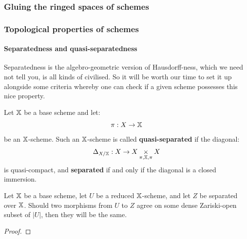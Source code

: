             \subsubsection{Gluing the ringed spaces of schemes}
            
            \subsubsection{Topological properties of schemes}
                \paragraph{Separatedness and quasi-separatedness}
                    Separatedness is the algebro-geometric version of Hausdorff-ness, which we need not tell you, is all kinds of civilised. So it will be worth our time to set it up alongside some criteria whereby one can check if a given scheme possesses this nice property. 
                    
                    \begin{definition} \label{def: separatedness}
                        Let $\mathbb{X}$ be a base scheme and let:
                            $$\pi: X \to \mathbb{X}$$
                        be an $\mathbb{X}$-scheme. Such an $\mathbb{X}$-scheme is called \textbf{quasi-separated} if the diagonal:
                            $$\Delta_{X/\bbX}: X \to X \x_{\pi, \bbX, \pi} X$$
                        is quasi-compact, and \textbf{separated} if and only if the diagonal is a closed immersion. 
                    \end{definition}
                    
                    \begin{lemma} \label{lemma: reduced_to_separated}
                        Let $\mathbb{X}$ be a base scheme, let $U$ be a reduced $\mathbb{X}$-scheme, and let $Z$ be separated over $\mathbb{X}$. Should two morphisms from $U$ to $Z$ agree on some dense Zariski-open subset of $|U|$, then they will be the same.
                    \end{lemma}
                        \begin{proof}
                            
                        \end{proof}
                    
